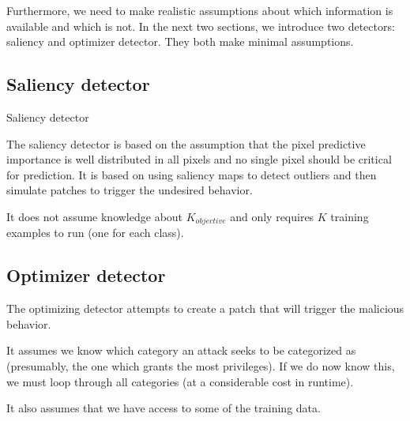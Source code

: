 \documentclass[letterpaper, 10 pt, conference]{ieeeconf}  %
\makeatletter
\def\BState{\State\hskip-\ALG@thistlm}
\makeatother
\begin{document}
Furthermore, we need to make realistic assumptions about which information is available and which is not. In the next two sections, we introduce two detectors: saliency and optimizer detector. They both make minimal assumptions.

\subsection{Saliency detector}


\begin{algorithm}
\caption{Saliency detector}\label{euclid}


\end{algorithm}


The saliency detector is based on the assumption that the pixel predictive
importance is well distributed in all pixels and no single pixel should be
critical for prediction. It is based on using saliency maps \cite{saliency}
to detect outliers and then simulate patches to trigger the undesired
behavior.

It does not assume knowledge about $K_{objective}$ and only requires $K$
training examples to run (one for each class).


\subsection{Optimizer detector}

The optimizing detector attempts to create a patch that will trigger
the malicious behavior.

It assumes we know which category an attack
seeks to be categorized as (presumably, the one which grants the most
privileges).  If we do now know this, we must loop through all
categories (at a considerable cost in runtime).

It also assumes that we have access to some of the training data.
\end{document}
